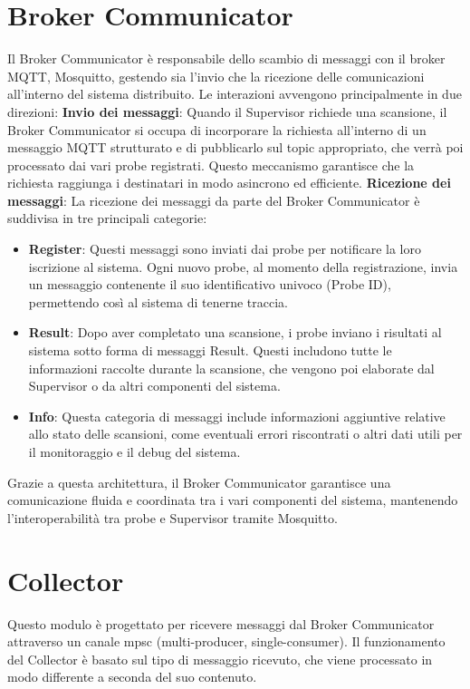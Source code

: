 \documentclass[target=bach,aauheader=,style=]{thud}
\begin{document}
\section{Broker Communicator}
Il Broker Communicator è responsabile dello scambio di messaggi con il broker MQTT, Mosquitto, gestendo sia l'invio che la ricezione delle comunicazioni all'interno del sistema distribuito. Le interazioni avvengono principalmente in due direzioni:
\newline
\textbf{Invio dei messaggi}: Quando il Supervisor richiede una scansione, il Broker Communicator si occupa di incorporare la richiesta all'interno di un messaggio MQTT strutturato e di pubblicarlo sul topic appropriato, che verrà poi processato dai vari probe registrati. Questo meccanismo garantisce che la richiesta raggiunga i destinatari in modo asincrono ed efficiente.
\newline
\textbf{Ricezione dei messaggi}: La ricezione dei messaggi da parte del Broker Communicator è suddivisa in tre principali categorie:
\begin{itemize}

  \item \textbf{Register}: Questi messaggi sono inviati dai probe per notificare la loro iscrizione al sistema. Ogni nuovo probe, al momento della registrazione, invia un messaggio contenente il suo identificativo univoco (Probe ID), permettendo così al sistema di tenerne traccia.

  \item \textbf{Result}: Dopo aver completato una scansione, i probe inviano i risultati al sistema sotto forma di messaggi Result. Questi includono tutte le informazioni raccolte durante la scansione, che vengono poi elaborate dal Supervisor o da altri componenti del sistema.

  \item \textbf{Info}: Questa categoria di messaggi include informazioni aggiuntive relative allo stato delle scansioni, come eventuali errori riscontrati o altri dati utili per il monitoraggio e il debug del sistema.
\end{itemize}

Grazie a questa architettura, il Broker Communicator garantisce una comunicazione fluida e coordinata tra i vari componenti del sistema, mantenendo l'interoperabilità tra probe e Supervisor tramite Mosquitto.

\section{Collector}
Questo modulo è progettato per ricevere messaggi dal Broker Communicator attraverso un canale mpsc (multi-producer, single-consumer). Il funzionamento del Collector è basato sul tipo di messaggio ricevuto, che viene processato in modo differente a seconda del suo contenuto.
\end{document}
